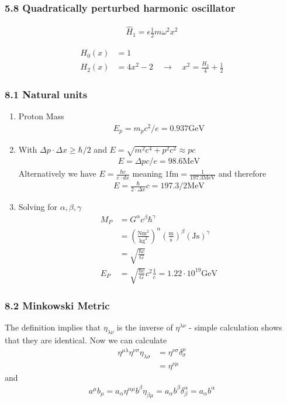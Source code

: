 \documentclass[10pt,a4paper]{article}
\theoremstyle{definition}
\begin{document}
\subsubsection{5.8 Quadratically perturbed harmonic oscillator}
\begin{align}
\hat{H}_1=\epsilon\frac{1}{2}m\omega^2x^2
\end{align}

\begin{align}
H_0(x)&=1\\
H_2(x)&=4x^2-2\quad\rightarrow\quad x^2=\frac{H_2}{4}+\frac{1}{2}
\end{align}


\subsubsection{8.1 Natural units}
\begin{enumerate}
\item Proton Mass
\begin{align}
      E_p=m_pc^2/e=0.937\text{GeV}
\end{align}
\item With $\Delta p\cdot\Delta x\ge\hbar/2$ and $E=\sqrt{m^2c^4+p^2c^2}\approx pc$
\begin{align}
	E=\Delta p c/e=98.6\text{MeV}
\end{align}
Alternatively we have $E=\frac{\hbar c}{e\cdot dx}$ meaning $1\text{fm}=\frac{1}{197.3\text{MeV}}$ and therefore
\begin{align}
	E=\frac{\hbar}{2\cdot\Delta x}c=197.3/2\text{MeV}
\end{align}
\item Solving for $\alpha,\beta,\gamma$
\begin{align}
	M_P
	&=G^\alpha c^\beta \hbar^\gamma\\
	&=\left(\frac{\text{Nm}^2}{\text{kg}^2}\right)^\alpha\left(\frac{\text{m}}{\text{s}}\right)^\beta\left(\text{Js}\right)^\gamma\\
	&=\sqrt{\frac{\hbar c}{G}}\\
	E_P&=\sqrt{\frac{\hbar c}{G}}c^2\frac{1}{e}=1.22\cdot10^{19}\text{GeV}
\end{align}
\end{enumerate}
\subsubsection{8.2 Minkowski Metric}
The definition implies that $\eta_{\lambda\nu}$ is the inverse of $\eta^{\lambda\nu}$ - simple calculation shows that they are identical. Now we can calculate
\begin{align}
\eta^{\mu\lambda}\eta^{\nu\sigma}\eta_{\lambda\sigma}
&=\eta^{\nu\sigma}\delta^\mu_\sigma\\
&=\eta^{\nu\mu}
\end{align}
and
\begin{align}
a^\mu b_\mu=a_\alpha\eta^{\alpha\mu}b^\beta\eta_{\beta\mu}=a_\alpha b^\beta\delta^\alpha_\beta=a_\alpha b^\alpha
\end{align}
\end{document}
